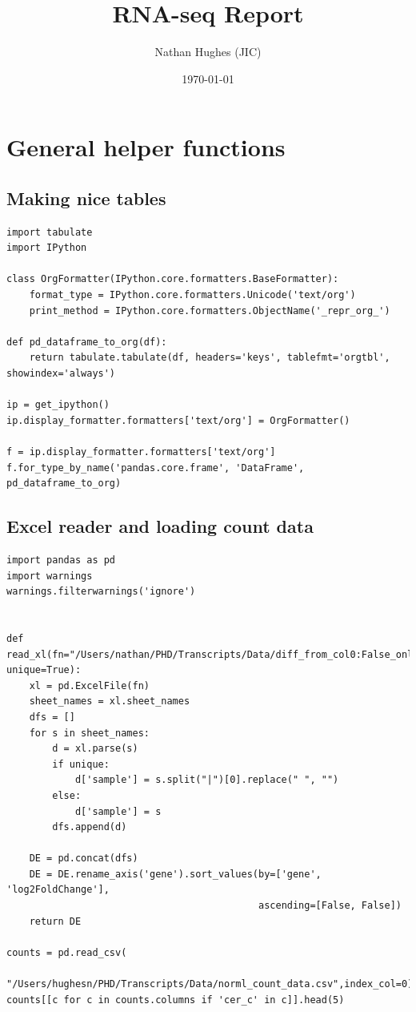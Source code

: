 \documentclass[11pt]{article}
\author{Nathan Hughes (JIC)}
\date{\today}
\title{RNA-seq Report}
\begin{document}
\maketitle
\tableofcontents




\section{General helper functions}
\label{sec:org8b61069}

\subsection{Making nice tables}
\label{sec:orgbc36656}

\begin{verbatim}
import tabulate
import IPython

class OrgFormatter(IPython.core.formatters.BaseFormatter):
    format_type = IPython.core.formatters.Unicode('text/org')
    print_method = IPython.core.formatters.ObjectName('_repr_org_')

def pd_dataframe_to_org(df):
    return tabulate.tabulate(df, headers='keys', tablefmt='orgtbl', showindex='always')

ip = get_ipython()
ip.display_formatter.formatters['text/org'] = OrgFormatter()

f = ip.display_formatter.formatters['text/org']
f.for_type_by_name('pandas.core.frame', 'DataFrame', pd_dataframe_to_org)
\end{verbatim}


\subsection{Excel reader and loading count data}
\label{sec:org11c7332}
\begin{verbatim}
import pandas as pd
import warnings
warnings.filterwarnings('ignore')


def read_xl(fn="/Users/nathan/PHD/Transcripts/Data/diff_from_col0:False_onlyDiff:False.xlsx", unique=True):
    xl = pd.ExcelFile(fn)
    sheet_names = xl.sheet_names
    dfs = []
    for s in sheet_names:
        d = xl.parse(s)
        if unique:
            d['sample'] = s.split("|")[0].replace(" ", "")
        else:
            d['sample'] = s
        dfs.append(d)

    DE = pd.concat(dfs)
    DE = DE.rename_axis('gene').sort_values(by=['gene', 'log2FoldChange'],
                                            ascending=[False, False])
    return DE

counts = pd.read_csv(
    "/Users/hughesn/PHD/Transcripts/Data/norml_count_data.csv",index_col=0)
counts[[c for c in counts.columns if 'cer_c' in c]].head(5)
\end{verbatim}
\end{document}
